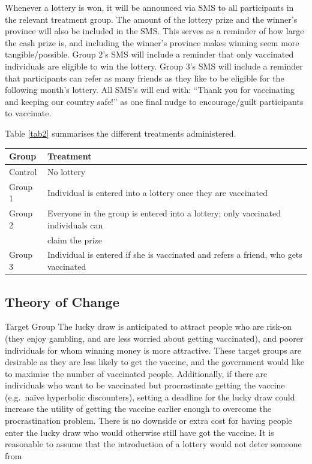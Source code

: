 \documentclass[11pt,preprint, authoryear]{elsarticle}
\let\origtable\table
\let\endorigtable\endtable
\renewenvironment{table}[1][2] {
    \expandafter\origtable\expandafter[H]
} {
    \endorigtable
}
\numberwithin{equation}{section}
\numberwithin{figure}{section}
\numberwithin{table}{section}
\begin{document}
Whenever a lottery is won, it will be announced via SMS to all
participants in the relevant treatment group. The amount of the lottery
prize and the winner's province will also be included in the SMS. This
serves as a reminder of how large the cash prize is, and including the
winner's province makes winning seem more tangible/possible. Group 2's
SMS will include a reminder that only vaccinated individuals are
eligible to win the lottery. Group 3's SMS will include a reminder that
participants can refer as many friends as they like to be eligible for
the following month's lottery. All SMS's will end with: ``Thank you for
vaccinating and keeping our country safe!'' as one final nudge to
encourage/guilt participants to vaccinate.

Table \ref{tab2} summarises the different treatments administered.

\begin{table}[H]
\centering
\begin{tabular}{ll}
  \toprule
Group & Treatment \\ 
  \midrule
Control & No lottery \\ 
  Group 1 & Individual is entered into a lottery once they are vaccinated \\ 
  Group 2 & Everyone in the group is entered into a lottery; only vaccinated individuals can \\ 
   & claim the prize \\ 
  Group 3 & Individual is entered if she is vaccinated and refers a friend, who gets vaccinated \\ 
   \bottomrule
\end{tabular}
\caption{Treatment Summary \label{tab2}} 
\end{table}

\hypertarget{theory-of-change}{%
\subsection{Theory of Change}\label{theory-of-change}}

Target Group The lucky draw is anticipated to attract people who are
risk-on (they enjoy gambling, and are less worried about getting
vaccinated), and poorer individuals for whom winning money is more
attractive. These target groups are desirable as they are less likely to
get the vaccine, and the government would like to maximise the number of
vaccinated people. Additionally, if there are individuals who want to be
vaccinated but procrastinate getting the vaccine (e.g.~naïve hyperbolic
discounters), setting a deadline for the lucky draw could increase the
utility of getting the vaccine earlier enough to overcome the
procrastination problem. There is no downside or extra cost for having
people enter the lucky draw who would otherwise still have got the
vaccine. It is reasonable to assume that the introduction of a lottery
would not deter someone from
\end{document}
